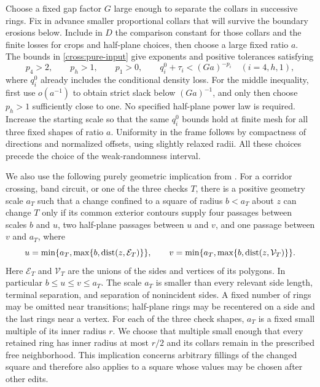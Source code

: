 Choose a fixed gap factor $G$ large enough to separate the collars in
successive rings.  Fix in advance smaller proportional collars that will
survive the boundary erosions below.  Include in $D$ the comparison
constant for those collars and the finite losses for crops and
half-plane choices, then choose a large fixed ratio $a$.  The bounds in
\eqref{cross:pure-input} give exponents and positive tolerances satisfying
\begin{equation}
 p_4>2,\qquad p_h>1,\qquad p_1>0,
 \qquad q_i^0+\tau_i<(Ga)^{-p_i}\quad(i=4,h,1),
 \label{cross:slack}
\end{equation}
where $q_i^0$ already includes the conditional density loss.
For the middle inequality, first use $o(a^{-1})$ to obtain strict slack
below $(Ga)^{-1}$, and only then choose $p_h>1$ sufficiently close to one.
No specified half-plane power law is required.  Increase the starting
scale so that the same $q_i^0$ bounds hold at finite mesh for all three
fixed shapes of ratio $a$.  Uniformity in the frame follows by compactness
of directions and normalized offsets, using slightly relaxed radii.
All these choices precede the choice of the weak-randomness interval.

We also use the following purely geometric implication from
\cite[Section~5, Lemma ``Passages forced by a pivotal square'']{S}.
For a corridor crossing, band circuit, or one of the three checks $T$,
there is a positive geometry scale $a_T$
such that a change confined to a square of radius $b<a_T$ about $z$
can change $T$ only if its common exterior contours supply four passages
between scales $b$ and $u$, two half-plane passages between $u$ and $v$,
and one passage between $v$ and $a_T$, where
\begin{equation}
 u=\min\{a_T,\max\{b,\operatorname{dist}(z,\mathcal E_T)\}\},\qquad
 v=\min\{a_T,\max\{b,\operatorname{dist}(z,\mathcal V_T)\}\}.
 \label{cross:distances}
\end{equation}
Here $\mathcal E_T$ and $\mathcal V_T$ are the unions of the sides and
vertices of its polygons.  In particular $b\leq u\leq v\leq a_T$.
The scale $a_T$ is smaller than every relevant side length, terminal
separation, and separation of nonincident sides.  A fixed number of
rings may be omitted near transitions; half-plane rings may be
recentered on a side and the last rings near a vertex.  For each of the
three check shapes, $a_T$ is a fixed small multiple of its inner radius
$r$.  We choose that multiple small enough that every retained ring has
inner radius at most $r/2$ and its collars remain in the prescribed free
neighborhood.  This implication concerns arbitrary fillings of the
changed square and therefore also applies to a square whose values may
be chosen after other edits.


